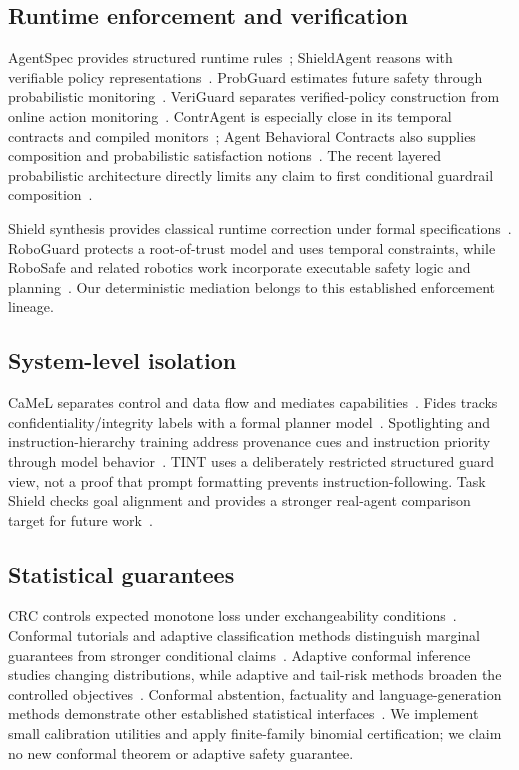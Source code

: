 \documentclass[lettersize,journal]{IEEEtran}
\begin{document}
\subsection{Runtime enforcement and verification}
AgentSpec provides structured runtime rules~\cite{arxiv250318666}; ShieldAgent
reasons with verifiable policy representations~\cite{arxiv250322738}.
ProbGuard estimates future safety through probabilistic
monitoring~\cite{arxiv250800500}. VeriGuard separates verified-policy
construction from online action monitoring~\cite{arxiv251005156}.
ContrAgent is especially close in its temporal contracts and compiled
monitors~\cite{arxiv260918128}; Agent Behavioral Contracts also supplies
composition and probabilistic satisfaction notions~\cite{arxiv260222302}.
The recent layered probabilistic architecture directly limits any claim to
first conditional guardrail composition~\cite{arxiv260518672}.

Shield synthesis provides classical runtime correction under formal
specifications~\cite{arxiv150102573,arxiv170808611,arxiv190805402,arxiv240604184}.
RoboGuard protects a root-of-trust model and uses temporal constraints, while
RoboSafe and related robotics work incorporate executable safety logic and
planning~\cite{arxiv250307885,arxiv251221220,arxiv250315707,arxiv260223719}.
Our deterministic mediation belongs to this established enforcement lineage.

\subsection{System-level isolation}
CaMeL separates control and data flow and mediates
capabilities~\cite{arxiv250318813}. Fides tracks confidentiality/integrity
labels with a formal planner model~\cite{arxiv250523643}. Spotlighting and
instruction-hierarchy training address provenance cues and instruction
priority through model behavior~\cite{arxiv240314720,arxiv240413208}.
TINT uses a deliberately restricted structured guard view, not a proof that
prompt formatting prevents instruction-following. Task Shield checks goal
alignment and provides a stronger real-agent comparison target for future
work~\cite{arxiv241216682}.

\subsection{Statistical guarantees}
CRC controls expected monotone loss under exchangeability
conditions~\cite{arxiv220802814}. Conformal tutorials and adaptive
classification methods distinguish marginal guarantees from stronger
conditional claims~\cite{arxiv210707511,arxiv200602544}.
Adaptive conformal inference studies changing distributions, while adaptive
and tail-risk methods broaden the controlled objectives~\cite{arxiv210600170,arxiv240617819,arxiv250220285}.
Conformal abstention, factuality and language-generation methods demonstrate
other established statistical interfaces~\cite{arxiv240501563,arxiv240210978,arxiv230610193,arxiv230518404,arxiv240301216}.
We implement small calibration utilities and apply finite-family binomial
certification; we claim no new conformal theorem or adaptive safety guarantee.
\end{document}
